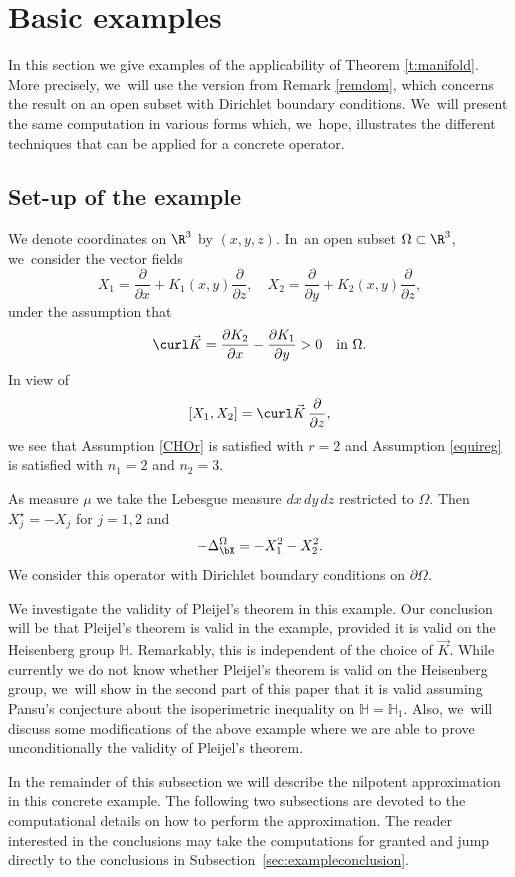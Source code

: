 \section{Basic examples}\label{AppA}

In this section we give examples of the applicability of Theorem \ref{t:manifold}. More precisely, we~will use the version from Remark \ref{remdom}, which concerns the result on an open subset with Dirichlet boundary conditions. We~will present the same computation in various forms which, we~hope, illustrates the different techniques that can be applied for a concrete operator.

\subsection{Set-up of the example}
We denote coordinates on $\R^3$ by $(x,y,z)$. In~an open subset $\Omega\subset\R^3$, we~consider the vector fields
\[
X_1= \frac{\partial}{\partial x} + K_1(x,y) \frac{\partial}{\partial z},
\quad
X_2= \frac{\partial}{\partial y} + K_2 (x,y) \frac{\partial}{\partial z},
\]
under the assumption that
\[
\curl \vec K = \frac{\partial K_2}{\partial x} - \frac{\partial K_1}{\partial y} >0
\quad\text{in}\ \Omega.
\]
In view of
\[
[X_1,X_2] = \curl \vec K \,\frac{\partial}{\partial z},
\]
we see that Assumption \ref{CHOr} is satisfied with $r=2$ and Assumption \ref{equireg} is satisfied with $n_1=2$ and $n_2=3$.

As measure $\mu$ we take the Lebesgue measure $dx\,dy\,dz$ restricted to $\Omega$. Then $X_j^\star = - X_j$ for $j=1,2$ and
\[
-\Delta_\bX^\Omega = - X_1^2- X_2^2.
\]
We consider this operator with Dirichlet boundary conditions on $\partial\Omega$.

We investigate the validity of Pleijel's theorem in this example. Our conclusion will be that Pleijel's theorem is valid in the example, provided it is valid on the Heisenberg group $\mathbb H$. Remarkably, this is independent of the choice of $\vec K$. While currently we do not know whether Pleijel's theorem is valid on the Heisenberg group, we~will show in the second part of this paper that it is valid assuming Pansu's conjecture about the isoperimetric inequality on $\mathbb H=\mathbb H_1$. Also, we~will discuss some modifications of the above example where we are able to prove unconditionally the validity of Pleijel's theorem.

In the remainder of this subsection we will describe the nilpotent approximation in this concrete example. The following two subsections are devoted to the computational details on how to perform the approximation. The reader interested in the conclusions may take the computations for granted and jump directly to the conclusions in Subsection~\ref{sec:exampleconclusion}.

